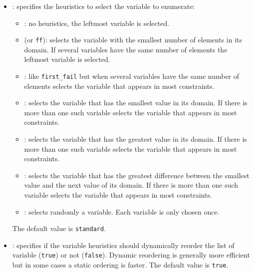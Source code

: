 \begin{itemize}

\item {}: specifies the
heuristics to select the variable to enumerate:

\begin{itemize}

\item {}: no heuristics, the leftmost variable is selected.

\item {} (or \texttt{ff}): selects the variable with the
smallest number of elements in its domain. If several variables have the
same number of elements the leftmost variable is selected.

\item {}: like \texttt{first\_fail} but when
several variables have the same number of elements selects the
variable that appears in most constraints.

\item {}: selects the variable that has the smallest value
in its domain. If there is more than one such variable selects the
variable that appears in most constraints.

\item {}: selects the variable that has the greatest value in
its domain. If there is more than one such variable selects the variable
that appears in most constraints.

\item {}: selects the variable that has the greatest
difference between the smallest value and the next value of its domain. If
there is more than one such variable selects the variable that appears in
most constraints.

\item {}: selects randomly a variable. Each variable is only
chosen once.

\end{itemize}

The default value is \texttt{standard}.

\item {}: specifies if the variable
heuristics should dynamically reorder the list of variable (\texttt{true}) or
not (\texttt{false}). Dynamic reordering is generally more efficient but in
some cases a static ordering is faster. The default value is
\texttt{true}.


\end{itemize}
